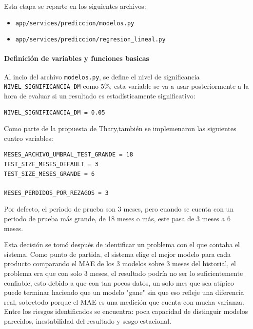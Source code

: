 Esta etapa se reparte en los siguientes archivos:

\begin{itemize}
\item \texttt{app/services/prediccion/modelos.py}
\item \texttt{app/services/prediccion/regresion\_lineal.py}
\end{itemize}

\paragraph{Definición de variables y funciones basicas}

Al incio del archivo \texttt{modelos.py}, se define el nivel de significancia \texttt{NIVEL\_SIGNIFICANCIA\_DM} como 5\%, esta variable se va a usar posteriormente a la hora de evaluar si un resultado es estadísticamente significativo:

\label{lst:nivel_significancia}
\begin{verbatim}
NIVEL_SIGNIFICANCIA_DM = 0.05
\end{verbatim}

Como parte de la propuesta de Thary,también se implemenaron las siguientes cuatro variables:

\label{lst:constantes_backtest}
\begin{verbatim}
MESES_ARCHIVO_UMBRAL_TEST_GRANDE = 18
TEST_SIZE_MESES_DEFAULT = 3
TEST_SIZE_MESES_GRANDE = 6

MESES_PERDIDOS_POR_REZAGOS = 3
\end{verbatim}

Por defecto, el periodo de prueba son 3 meses, pero cuando se cuenta con un periodo de prueba más grande, de 18 meses o más, este pasa de 3 meses a 6 meses.

Esta decisión se tomó después de identificar un problema con el que contaba el sistema. Como punto de partida, el sistema elige el mejor modelo para cada producto comparando el MAE de los 3 modelos sobre 3 meses del historial, el problema era que con solo 3 meses, el resultado podría no ser lo suficientemente confiable, esto debido a que con tan pocos datos, un solo mes que sea atípico puede terminar haciendo que un modelo "gane" sin que eso refleje una diferencia real, sobretodo porque el MAE es una medición que cuenta con mucha varianza. Entre los riesgos identificados se encuentra: poca capacidad de distinguir modelos parecidos, inestabilidad del resultado y sesgo estacional.

